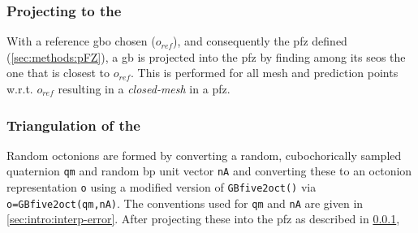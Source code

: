 \documentclass[preprint,12pt]{elsarticle}
\begin{document}
\subsubsection{Projecting  to the }
\label{sec:methods:proj}


With a reference \gls{gbo} chosen ($o_{ref}$), and consequently the \gls{pfz} defined (\cref{sec:methods:pFZ}), a \gls{gb} is projected into the \gls{pfz} by finding among its \glspl{seo} the one that is closest to $o_{ref}$. This is performed for all mesh and prediction points w.r.t. $o_{ref}$ resulting in a \textit{closed-mesh} in a \gls{pfz}.


\subsubsection{Triangulation of the }
\label{sec:methods:tri}


Random octonions are formed by converting a random, cubochorically sampled quaternion \cite{singhOrientationSamplingDictionarybased2016} \texttt{qm} and random \gls{bp} unit vector \texttt{nA} and converting these to an octonion representation \texttt{o} using a modified version \cite{bairdFiveDegreeofFreedom5DOF2020} of \texttt{GBfive2oct()} \cite{chesserGBOctonionCode2019} via \texttt{o=GBfive2oct(qm,nA)}. The conventions used for \texttt{qm} and \texttt{nA} are given in \cref{sec:intro:interp-error}. After projecting these into the \gls{pfz} as described in \cref{sec:methods:proj}, %
\end{document}
